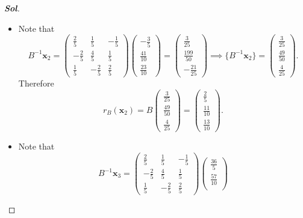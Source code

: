 \begin{enumerate}
\begin{proof}[\normalfont\color{magenta}\bfseries Sol]
\begin{itemize}
\[\begin{pmatrix}
				\frac15\\[2pt]
				\frac7{10}\\[2pt]
				\frac35
			\end{pmatrix}.
			\]
			\newpage
			\item[($\mathbf x_2$)] Note that
			\[
			B^{-1}\mathbf x_2
			=
			\begin{pmatrix}
				\frac25&\frac15&-\frac15\\
				-\frac25&\frac45&\frac15\\
				\frac15&-\frac25&\frac25
			\end{pmatrix}
			\begin{pmatrix}
				-\frac35\\[2pt]
				\frac{41}{10}\\[2pt]
				\frac{23}{10}
			\end{pmatrix}
			=
			\begin{pmatrix}
				\frac3{25}\\[2pt]
				\frac{199}{50}\\[2pt]
				-\frac{21}{25}
			\end{pmatrix}\implies
			\bigl\{B^{-1}\mathbf x_2\bigr\}
			=
			\begin{pmatrix}
				\frac3{25}\\[2pt]
				\frac{49}{50}\\[2pt]
				\frac4{25}
			\end{pmatrix}.
			\]
			Therefore
			\[
			r_B(\mathbf x_2)
			=
			B
			\begin{pmatrix}
				\frac3{25}\\[2pt]
				\frac{49}{50}\\[2pt]
				\frac4{25}
			\end{pmatrix}
			=
			\begin{pmatrix}
				\frac25\\[2pt]
				\frac{11}{10}\\[2pt]
				\frac{13}{10}
			\end{pmatrix}.
			\]
			\item[($\mathbf x_3$)] Note that
			\[
			B^{-1}\mathbf x_3
			=
			\begin{pmatrix}
				\frac25&\frac15&-\frac15\\
				-\frac25&\frac45&\frac15\\
				\frac15&-\frac25&\frac25
			\end{pmatrix}
			\begin{pmatrix}
				\frac{36}{5}\\[2pt]
				\frac{57}{10}\\[2pt]

\end{pmatrix}\]
\end{itemize}
\end{proof}
\end{enumerate}
